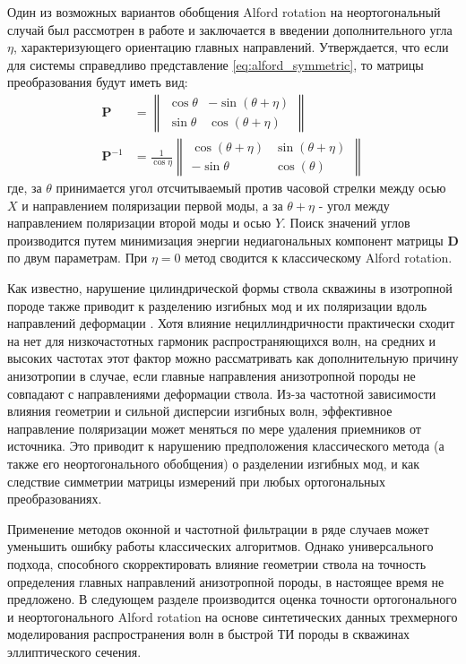 \documentclass[a4paper,11pt]{article}
\begin{document}
Один из возможных вариантов обобщения Alford rotation на неортогональный случай был рассмотрен в работе \cite{Dellinger1998} и заключается в введении дополнительного угла $\eta$, характеризующего ориентацию главных направлений. Утверждается, что если для системы справедливо представление \eqref{eq:alford_symmetric}, то матрицы преобразования будут иметь вид:
\begin{align*}
\mathbf{P} &= \left\|
\begin{array}{cc}
\cos \theta & -\sin (\theta+\eta) \\ 
\sin \theta & \cos (\theta+\eta)
\end{array} 
\right\| \\
\mathbf{P}^{-1} &= \frac{1}{\cos \eta} \left\|
\begin{array}{cc}
\cos (\theta+\eta) & \sin (\theta+\eta) \\ 
-\sin \theta & \cos (\theta)
\end{array} 
\right\|
\end{align*}
где, за $\theta$ принимается угол отсчитываемый против часовой стрелки между осью $X$ и направлением поляризации первой моды, а за $\theta + \eta$ - угол между направлением поляризации второй моды и осью $Y$. Поиск значений углов производится путем минимизация энергии недиагональных компонент матрицы $\mathbf{D}$ по двум параметрам. При $\eta=0$ метод сводится к классическому Alford rotation. 

Как известно, нарушение цилиндрической формы ствола скважины в изотропной породе также приводит к разделению изгибных мод и их поляризации вдоль направлений деформации \cite{Seroices2010}. Хотя влияние нециллиндричности практически сходит на нет для низкочастотных гармоник распространяющихся волн, на средних и высоких частотах этот фактор можно рассматривать как дополнительную причину анизотропии в случае, если главные направления анизотропной породы не совпадают с направлениями деформации ствола. Из-за частотной зависимости влияния геометрии и сильной дисперсии изгибных волн, эффективное направление поляризации может меняться по мере удаления приемников от источника. Это приводит к нарушению предположения классического метода (а также его неортогонального обобщения) о разделении изгибных мод, и как следствие симметрии матрицы измерений при любых ортогональных преобразованиях. 

Применение методов оконной и частотной фильтрации в ряде случаев может уменьшить ошибку работы классических алгоритмов. Однако универсального подхода, способного скорректировать влияние геометрии ствола на точность определения главных направлений анизотропной породы, в настоящее время не предложено. В следующем разделе производится оценка точности ортогонального и неортогонального Alford rotation на основе синтетических данных трехмерного моделирования распространения волн в быстрой ТИ породы в скважинах эллиптического сечения.  
\end{document}
